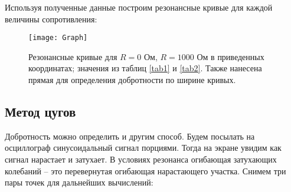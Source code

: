 \documentclass{lab}
\begin{document}
\begin{table}[H]
\centering
\renewcommand{\arraystretch}{1.3}
\renewcommand{\arraystretch}{1}
\caption{\footnotesize Полученные значения зависимости амплитудного напряжения от частоты
	для дальнейшего построения АЧХ при R = 100 Ом}
\label{tab2}
\end{table}

Используя полученные данные построим резонансные кривые для каждой величины сопротивления:

\begin{figure}[H]
	\centering
	\texttt{[image: Graph]}
	\caption{\footnotesize Резонансные кривые для $R = 0$ Ом, $R = 1000$ Ом в приведенных
		координатах; значения из таблиц \ref{tab1} и \ref{tab2}. Также нанесена прямая для
		определения добротности по ширине кривых.}
\end{figure}

\newpage

\subsection*{Метод цугов}

Добротность можно определить и другим способ. Будем посылать на осциллограф синусоидальный
сигнал порциями. Тогда на экране увидим как сигнал нарастает и затухает. В условиях
резонанса огибающая затухающих колебаний -- это перевернутая огибающая нарастающего участка.
Снимем три пары точек для дальнейших вычислений:
\end{document}
